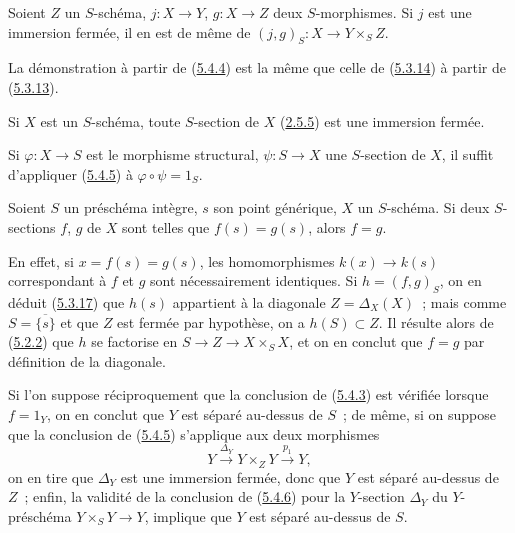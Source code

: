 \begin{corollary}[5.4.5]
\label{I.5.4.5-fr}
Soient $Z$ un $S$-schéma, $j:X\to Y$, $g:X\to Z$ deux $S$-morphismes. Si $j$
est une immersion fermée, il en est de même de
$(j,g)_S:X\to Y\times_S Z$.
\end{corollary}

La démonstration à partir de (\hyperref[I.5.4.4-fr]{5.4.4}) est la même que
celle de (\hyperref[I.5.3.14-fr]{5.3.14}) à partir de
(\hyperref[I.5.3.13-fr]{5.3.13}).

\begin{corollary}[5.4.6]
\label{I.5.4.6-fr}
Si $X$ est un $S$-schéma, toute $S$-section de $X$
(\hyperref[I.2.5.5-fr]{2.5.5}) est une immersion fermée.
\end{corollary}

Si $\varphi:X\to S$ est le morphisme structural, $\psi:S\to X$ une
$S$-section de $X$, il suffit d'appliquer
(\hyperref[I.5.4.5-fr]{5.4.5}) à $\varphi\circ\psi=1_S$.

\begin{corollary}[5.4.7]
\label{I.5.4.7-fr}
Soient $S$ un préschéma intègre, $s$ son point générique, $X$ un $S$-schéma.
Si deux $S$-sections $f$, $g$ de $X$ sont telles que $f(s)=g(s)$, alors
$f=g$.
\end{corollary}

En effet, si $x=f(s)=g(s)$, les homomorphismes $k(x)\to k(s)$ correspondant à
$f$ et $g$ sont nécessairement identiques. Si $h=(f,g)_S$, on en déduit
(\hyperref[I.5.3.17-fr]{5.3.17}) que $h(s)$ appartient à la diagonale
$Z=\Delta_X(X)$~; mais comme $S=\overline{\{s\}}$ et que $Z$ est fermée par
hypothèse, on a $h(S)\subset Z$. Il résulte alors de
(\hyperref[I.5.2.2-fr]{5.2.2}) que $h$ se factorise en
$S\to Z\to X\times_S X$, et on en conclut que $f=g$ par définition de la
diagonale.

\begin{remark}[5.4.8]
\label{I.5.4.8-fr}
Si l'on suppose réciproquement que la conclusion de
(\hyperref[I.5.4.3-fr]{5.4.3}) est vérifiée lorsque $f=1_Y$, on en conclut
que $Y$ est séparé au-dessus de $S$~; de même, si on suppose que la conclusion
de (\hyperref[I.5.4.5-fr]{5.4.5}) s'applique aux deux morphismes
\[
  Y\xrightarrow{\Delta_Y}Y\times_Z Y\xrightarrow{p_1}Y,
\]
on en tire que $\Delta_Y$ est une immersion fermée, donc que $Y$ est séparé
au-dessus de $Z$~; enfin, la validité de la conclusion de
(\hyperref[I.5.4.6-fr]{5.4.6}) pour la $Y$-section $\Delta_Y$ du
$Y$-préschéma $Y\times_S Y\to Y$, implique que $Y$ est séparé au-dessus de
$S$.
\end{remark}

